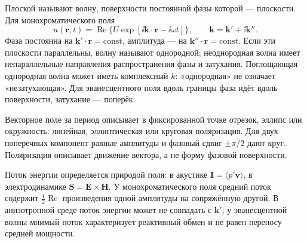 
Плоской называют волну, поверхности постоянной фазы которой — плоскости. Для монохроматического поля
\begin{equation}
 u(\bm r,t)=\operatorname{Re}\{U\exp[\ii\bm k\cdot\bm r-\ii\omega t]\},\qquad \bm k=\bm k'+\ii\bm k''.
\end{equation}
Фаза постоянна на $\bm k'\cdot\bm r=\mathrm{const}$, амплитуда — на $\bm k''\cdot\bm r=\mathrm{const}$. Если эти плоскости параллельны, волну называют однородной; неоднородная волна имеет непараллельные направления распространения фазы и затухания. Поглощающая однородная волна может иметь комплексный $k$: «однородная» не означает «незатухающая». Для эванесцентного поля вдоль границы фаза идёт вдоль поверхности, затухание — поперёк.

Векторное поле за период описывает в фиксированной точке отрезок, эллипс или окружность: линейная, эллиптическая или круговая поляризация. Для двух поперечных компонент равные амплитуды и фазовый сдвиг $\pm\pi/2$ дают круг. Поляризация описывает движение вектора, а не форму фазовой поверхности.

Поток энергии определяется природой поля: в акустике $\bm I=\langle p'\bm v\rangle$, в электродинамике $\bm S=\bm E\times\bm H$. У монохроматического поля средний поток содержит $\frac12\operatorname{Re}$ произведения одной амплитуды на сопряжённую другой. В анизотропной среде поток энергии может не совпадать с $\bm k'$; у эванесцентной волны мнимый поток характеризует реактивный обмен и не равен переносу средней мощности.
